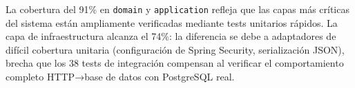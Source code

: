 \begin{table}[h]
\centering
{}
\caption{Resumen de tests y cobertura del backend (medida con JaCoCo).}
\label{tab:resumen_tests}
\end{table}

La cobertura del 91\% en \texttt{domain} y \texttt{application} refleja que las
capas más críticas del sistema están ampliamente verificadas mediante tests
unitarios rápidos. La capa de infraestructura alcanza el 74\%: la diferencia
se debe a adaptadores de difícil cobertura unitaria (configuración de Spring
Security, serialización JSON), brecha que los 38 tests de integración compensan
al verificar el comportamiento completo HTTP→base de datos con PostgreSQL real.
